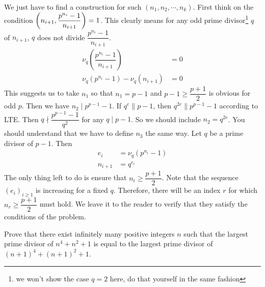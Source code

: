 \begin{solution}
	We just have to find a construction for such $(n_1,n_2,\cdots,n_k)$. First think on the condition $\left(n_{i+1},\dfrac{p^{n_i}-1}{n_{i+1}}\right)=1$. This clearly means for any odd prime divisor\footnote{we won't show the case $q=2$ here, do that yourself in the same fashion} $q$ of $n_{i+1}$, $q$ does not divide $\dfrac{p^{n_i}-1}{n_{i+1}}$.
		\begin{align*}
			\nu_q\left(\dfrac{p^{n_i}-1}{n_{i+1}}\right) & = 0\\
			\nu_q(p^{n_i}-1)-\nu_q(n_{i+1}) & = 0
		\end{align*}
	This suggests us to take $n_1$ so that $n_1=p-1$ and $p-1\geq\dfrac{p+1}{2}$ is obvious for odd $p$. Then we have $n_2\mid p^{p-1}-1$. If $q^e\|p-1$, then $q^{2e}\|p^{p-1}-1$ according to LTE. Then $q\nmid\dfrac{p^{p-1}-1}{q^2}$ for any $q\mid p-1$. So we should include $n_2=q^{2e}$. You should understand that we have to define $n_3$ the same way. Let $q$ be a prime divisor of $p-1$. Then
		\begin{align*}
			e_i & = \nu_q\left(p^{n_i}-1\right)\\
			n_{i+1} & = q^{e_i}
		\end{align*}
	The only thing left to do is ensure that $n_i\geq\dfrac{p+1}{2}$. Note that the sequence $(e_i)_{i\geq1}$ is increasing for a fixed $q$. Therefore, there will be an index $r$ for which $n_r\geq\dfrac{p+1}{2}$ must hold. We leave it to the reader to verify that they satisfy the conditions of the problem.
\end{solution}

\begin{problem}
	Prove that there exist infinitely many positive integers $n$ such that the largest prime divisor of $n^4+n^2+1$ is equal to the largest prime divisor of $(n+1)^4+(n+1)^2+1$.
\end{problem}

